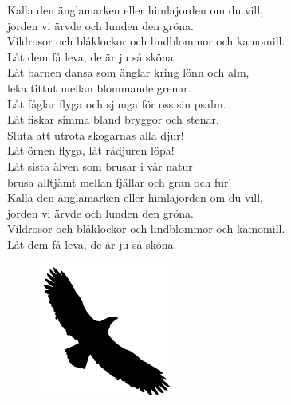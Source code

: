\documentclass[a6paper, 10pt, twoside]{article}
\begin{document}

\noindent
\begin{center}
\end{center}
\begin{lyrics}
Kalla den änglamarken eller himlajorden om du vill,\\
jorden vi ärvde och lunden den gröna.\\
Vildrosor och blåklockor \physicalonly{\\}och lindblommor och kamomill.\\
Låt dem få leva, de är ju så sköna.
\vspace{5pt}\\
Låt barnen dansa som änglar kring lönn och alm,\\
leka tittut mellan blommande grenar.\\
Låt fåglar flyga och sjunga för oss sin psalm.\\
Låt fiskar simma bland bryggor och stenar.
\vspace{5pt}\\
Sluta att utrota skogarnas alla djur!\\
Låt örnen flyga, låt rådjuren löpa!\\
Låt sista älven som brusar i vår natur\\
brusa alltjämt mellan fjällar och gran och fur!
\vspace{5pt}\\
Kalla den änglamarken eller himlajorden om du vill,\\
jorden vi ärvde och lunden den gröna.\\
Vildrosor och blåklockor \physicalonly{\\}och lindblommor och kamomill.\\
Låt dem få leva, de är ju så sköna.
\end{lyrics}
\begin{figure}[!h]
\centering
\includegraphics[width=0.4\textwidth]{eagle.png}
\end{figure}
\end{document}
